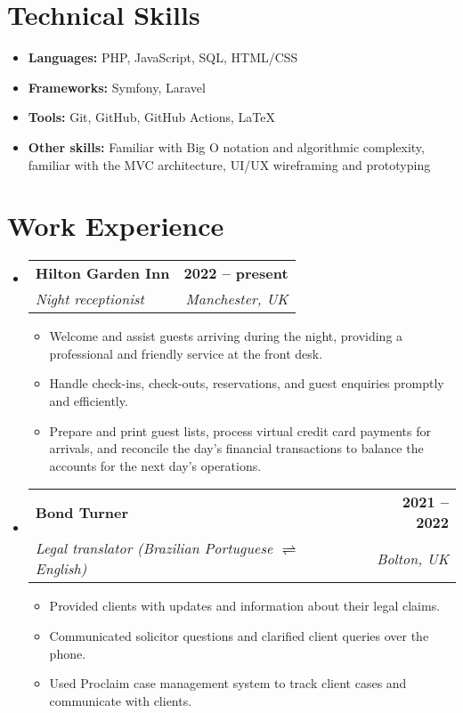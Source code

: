 \documentclass[a4paper,12pt]{article}
\makeatletter
\newcommand{\resumeSubHeadingListStart}{\begin{itemize}[leftmargin=0in, label={}]}
\newcommand{\resumeSubHeadingListEnd}{\end{itemize}}
\newcommand{\resumeSubheading}[4]{
  \item
    \begin{tabular*}{\textwidth}[t]{l@{\extracolsep{\fill}}r}
      \textbf{#1} & #2 \\
      \textit{#3} & \textit{#4} \\
    \end{tabular*}\vspace{-2pt}
}
\newcommand{\resumeItem}[1]{\item #1}
\newcommand{\resumeItemListStart}{\begin{itemize}[leftmargin=2em, label=\textbullet, itemsep=2pt]}
\newcommand{\resumeItemListEnd}{\end{itemize}}
\makeatother
\begin{document}
\section{Technical Skills}
\resumeItemListStart
    \resumeItem{\textbf{Languages:} PHP, JavaScript, SQL, HTML/CSS}
    \resumeItem{\textbf{Frameworks:} Symfony, Laravel}
    \resumeItem{\textbf{Tools:} Git, GitHub, GitHub Actions, \LaTeX}
    \resumeItem{\textbf{Other skills:} Familiar with Big O notation and algorithmic complexity, familiar with the MVC architecture, UI/UX wireframing and prototyping}
\resumeItemListEnd

\vfill

\section{Work Experience}
\resumeSubHeadingListStart

    \resumeSubheading
    {Hilton Garden Inn}{\bfseries{2022 -- present}}
    {Night receptionist}{Manchester, UK}
        \resumeItemListStart
            \resumeItem{Welcome and assist guests arriving during the night, providing a professional and friendly service at the front desk.}
            \resumeItem{Handle check-ins, check-outs, reservations, and guest enquiries promptly and efficiently.}
            \resumeItem{Prepare and print guest lists, process virtual credit card payments for arrivals, and reconcile the day’s financial transactions to balance the accounts for the next day’s operations.}
        \resumeItemListEnd

\resumeSubHeadingListEnd

\resumeSubHeadingListStart
    \resumeSubheading
    {Bond Turner}{\bfseries{2021 -- 2022}}
    {Legal translator (Brazilian Portuguese \(\rightleftharpoons\) English)}{Bolton, UK}
        \resumeItemListStart
            \resumeItem{Provided clients with updates and information about their legal claims.}
            \resumeItem{Communicated solicitor questions and clarified client queries over the phone.}
            \resumeItem{Used Proclaim case management system to track client cases and communicate with clients.}
        \resumeItemListEnd

\resumeSubHeadingListEnd
\end{document}
